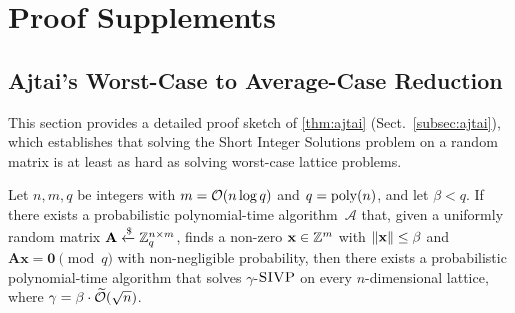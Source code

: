 \appendix
\chapter{Proof Supplements}
\label{app:proofs}



\section{Ajtai's Worst-Case to Average-Case Reduction}
\label{app:ajtai}

This section provides a detailed proof sketch of
\cref{thm:ajtai} (Sect.~\ref{subsec:ajtai}), which
establishes that solving the Short Integer Solutions problem on
a random matrix is at least as hard as solving worst-case
lattice problems.

\begin{theorem}
\label{thm:ajtai-app}
Let $n, m, q$ be integers with $m = \mathcal{O}(n \log q)$ and
$q = \operatorname{poly}(n)$, and let $\beta < q$.  If there exists a
probabilistic polynomial-time algorithm~$\mathcal{A}$ that,
given a uniformly random matrix
$\mathbf{A} \getsr \Zq^{n \times m}$, finds a non-zero
$\mathbf{x} \in \mathbb{Z}^m$ with $\left\lVert \mathbf{x} \right\rVert \leq \beta$ and
$\mathbf{A}\mathbf{x} = \mathbf{0} \pmod{q}$ with non-negligible
probability, then there exists a probabilistic polynomial-time
algorithm that solves $\gamma$-$\textsc{SIVP}$ on every
$n$-dimensional lattice, where
$\gamma = \beta \cdot \widetilde{\mathcal{O}}(\sqrt{n})$.
\end{theorem}

